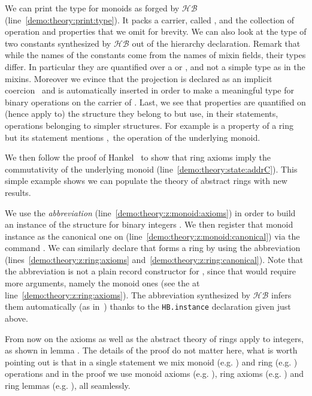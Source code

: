 \documentclass[a4paper,UKenglish,cleveref, autoref]{lipics-v2019}
\newcommand{\HB}{\ensuremath{\mathcal{HB}}}
\newcommand{\mixin}{mixin}
\newcommand{\mixins}{mixins}
\newcommand{\phantterm}{abbreviation}
\newcommand{\hbinstance}{{\tt\color{dkgreen}HB.instance}}
\theoremstyle{implem}
\theoremstyle{implem}
\theoremstyle{command}
\theoremstyle{commands}
\begin{document}
We can print the type for monoids as forged by \HB{} (line~\ref{demo:theory:print:type}).
It packs a carrier, called , and the collection of operation and
properties that we omit for brevity.  We can also look at the type of two
constants synthesized by \HB{} out of the hierarchy declaration. Remark that
while the names of the constants come from the names of \mixin{} fields,
their types differ.
In particular they are quantified over a  or ,
and not a simple type  as in the \mixins{}. Moreover we evince that
the  projection is declared as an implicit coercion~\cite{Saibi97}
and is automatically inserted in order to make  a meaningful
type for binary operations on the carrier of . Last, we see that
properties are quantified on (hence apply to) the structure they belong to but
use, in their statements, operations belonging to simpler structures.
For example  is a property of a ring but  its statement mentions ,\
the operation of the underlying monoid.

We then follow the proof of Hankel~\cite{nearrings} to show that
ring axioms imply the commutativity of the underlying monoid
(line~\ref{demo:theory:state:addrC}). This simple example shows we can
populate the theory of abstract rings with new results.

We use the  \emph{\phantterm{}}
(line~\ref{demo:theory:z:monoid:axioms})
in order to build an instance of the 
structure for binary integers .
We then register that monoid instance as the canonical one on 
(line~\ref{demo:theory:z:monoid:canonical}) via the command
.
We can similarly declare that  forms a ring by using
the  \phantterm{}
(lines~\ref{demo:theory:z:ring:axioms} and~\ref{demo:theory:z:ring:canonical}).
Note that the \coq{Ring_of_Monoid.Build} \phantterm{} is not
a plain record constructor for , since that
would require more arguments, namely the monoid ones (see the \coq{_}
at line~\ref{demo:theory:z:ring:axioms}). The
\phantterm{} synthesized by \HB{} infers them automatically
(as in~\cite[Section 7]{DBLP:conf/itp/MahboubiT13}) thanks to the \hbinstance{}
declaration given just above.

From now on the axioms as well as the abstract theory of rings apply to
integers, as shown in lemma \coq{exercise}. The details of the proof
do not matter here, what is worth pointing out is that in a single
statement we mix monoid (e.g. \coq{+}) and ring (e.g. \coq{-}) operations and in the
proof we use monoid axioms (e.g. \coq{addrA}), ring axioms
(e.g. ) and ring lemmas (e.g. ), all seamlessly.
\end{document}
